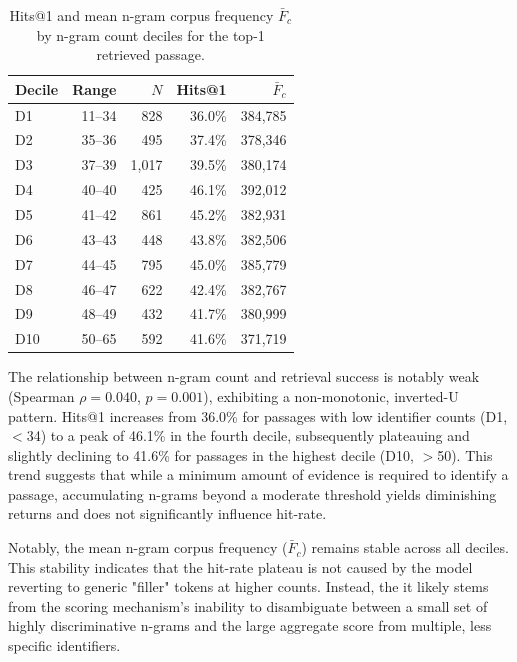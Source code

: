 \begin{table}[htbp]
    \centering
    \caption{Hits@1 and mean n-gram corpus frequency $\bar{F}_c$ by n-gram count deciles for the top-1 retrieved passage.}
    \label{tab:ngram-count}
    \begin{tabular}{lrrrr}
        \toprule
        \textbf{Decile} & \textbf{Range} & \textbf{$N$} & \textbf{Hits@1} & \textbf{$\bar{F}_c$} \\
        \midrule
        D1  & 11--34 & 828  & 36.0\% & 384,785 \\
        D2  & 35--36 & 495  & 37.4\% & 378,346 \\
        D3  & 37--39 & 1,017 & 39.5\% & 380,174 \\
        D4  & 40--40 & 425  & 46.1\% & 392,012 \\
        D5  & 41--42 & 861  & 45.2\% & 382,931 \\
        D6  & 43--43 & 448  & 43.8\% & 382,506 \\
        D7  & 44--45 & 795  & 45.0\% & 385,779 \\
        D8  & 46--47 & 622  & 42.4\% & 382,767 \\
        D9  & 48--49 & 432  & 41.7\% & 380,999 \\
        D10 & 50--65 & 592  & 41.6\% & 371,719 \\
        \bottomrule
    \end{tabular}
\end{table}

The relationship between n-gram count and retrieval success is notably weak (Spearman $\rho = 0.040$, $p = 0.001$), exhibiting a non-monotonic, inverted-U pattern. Hits@1 increases from 36.0\% for passages with low identifier counts (D1, $<$34) to a peak of 46.1\% in the fourth decile, subsequently plateauing and slightly declining to 41.6\% for passages in the highest decile (D10, $>$50). This trend suggests that while a minimum amount of evidence is required to identify a passage, accumulating n-grams beyond a moderate threshold yields diminishing returns and does not significantly influence hit-rate.

Notably, the mean n-gram corpus frequency ($\bar{F}_c$) remains stable across all deciles. This stability indicates that the hit-rate plateau is not caused by the model reverting to generic "filler" tokens at higher counts. Instead, the it likely stems from the scoring mechanism's inability to disambiguate between a small set of highly discriminative n-grams and the large aggregate score from multiple, less specific identifiers.


